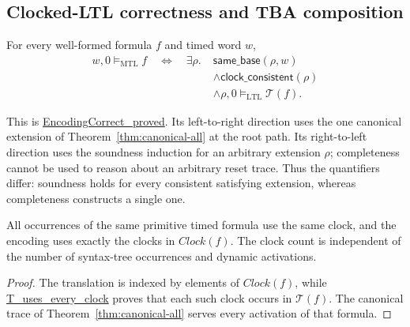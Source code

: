 \documentclass[manuscript]{acmart}
\newcommand{\satM}{\models_{\mathrm{MTL}}}
\newcommand{\satL}{\models_{\mathrm{LTL}}}
\newcommand{\T}{\mathcal{T}}
\newcommand{\Clock}{\mathit{Clock}}
\newcommand{\Rocqid}[1]{\url{#1}}
\begin{document}
\subsection{Clocked-LTL correctness and TBA composition}
\begin{theorem}
\label{thm:encoding-correctness}
For every well-formed formula $f$ and timed word $w$,
\begin{align*}
w,0\satM f\quad\Longleftrightarrow\quad
\exists\rho.\;&\mathsf{same\_base}(\rho,w)\\[-1mm]
&\land\mathsf{clock\_consistent}(\rho)\\[-1mm]
&\land\rho,0\satL\T(f).
\end{align*}
\end{theorem}
This is \Rocqid{EncodingCorrect_proved}. Its left-to-right direction uses
the one canonical extension of Theorem~\ref{thm:canonical-all} at the root
path. Its right-to-left direction uses the soundness induction for an
arbitrary extension $\rho$; completeness cannot be used to reason about an
arbitrary reset trace. Thus the quantifiers differ: soundness holds
for every consistent satisfying extension, whereas completeness constructs a
single one.

\begin{corollary}
\label{cor:one-clock-formula}
All occurrences of the same primitive timed formula use the same clock, and
the encoding uses exactly the clocks in $\Clock(f)$. The clock count is
independent of the number of syntax-tree occurrences and dynamic activations.
\end{corollary}
\begin{proof}
The translation is indexed by elements of $\Clock(f)$, while
\Rocqid{T_uses_every_clock} proves that each such clock occurs in $\T(f)$.
The canonical trace of Theorem~\ref{thm:canonical-all} serves every activation
of that formula.
\end{proof}
\end{document}
